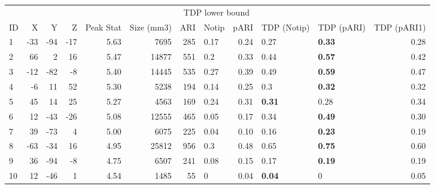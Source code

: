 
\begin{tabular}{lrrrrrrlrllr}
\toprule
\multicolumn{6}{c}{ } & \multicolumn{3}{c}{TDP lower bound} \\
\cmidrule(l{3pt}r{3pt}){7-9}
ID & X & Y & Z & Peak Stat & Size (mm3) & ARI & Notip & pARI & TDP (Notip) & TDP (pARI) & TDP (pARI1)\\
\midrule
1 & -33 & -94 & -17 & 5.63 & 7695 & 285 & 0.17 & 0.24 & 0.27 & \textbf{0.33} & 0.28\\
2 & 66 & 2 & 16 & 5.47 & 14877 & 551 & 0.2 & 0.33 & 0.44 & \textbf{0.57} & 0.42\\
3 & -12 & -82 & -8 & 5.40 & 14445 & 535 & 0.27 & 0.39 & 0.49 & \textbf{0.59} & 0.47\\
4 & -6 & 11 & 52 & 5.30 & 5238 & 194 & 0.14 & 0.25 & 0.3 & \textbf{0.32} & 0.32\\
5 & 45 & 14 & 25 & 5.27 & 4563 & 169 & 0.24 & 0.31 & \textbf{0.31} & 0.28 & 0.34\\
6 & 12 & -43 & -26 & 5.08 & 12555 & 465 & 0.05 & 0.17 & 0.34 & \textbf{0.49} & 0.30\\
7 & 39 & -73 & 4 & 5.00 & 6075 & 225 & 0.04 & 0.10 & 0.16 & \textbf{0.23} & 0.19\\
8 & -63 & -34 & 16 & 4.95 & 25812 & 956 & 0.3 & 0.48 & 0.65 & \textbf{0.75} & 0.60\\
9 & 36 & -94 & -8 & 4.75 & 6507 & 241 & 0.08 & 0.15 & 0.17 & \textbf{0.19} & 0.19\\
10 & 12 & -46 & 1 & 4.54 & 1485 & 55 & 0 & 0.04 & \textbf{0.04} & 0 & 0.05\\
\bottomrule
\end{tabular}
